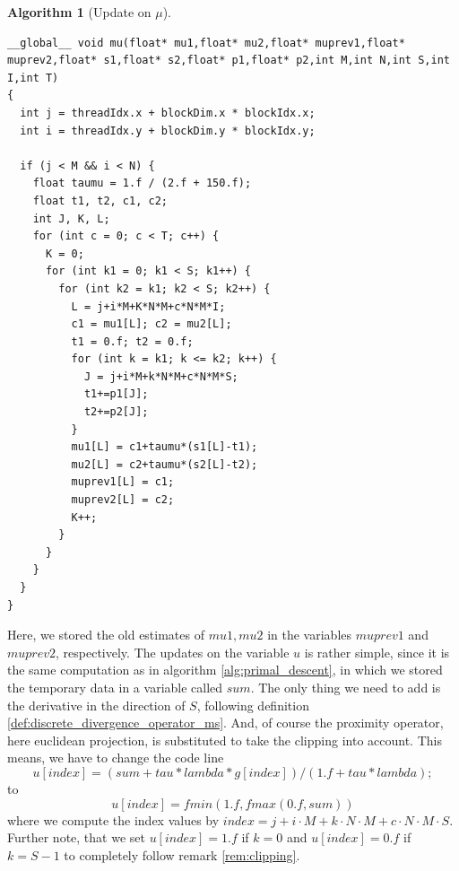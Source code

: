 \documentclass{scrreprt}
\newtheorem{algorithm}[theorem]{Algorithm}
\begin{document}
            \begin{algorithm}[Update on $\mu$]
                \label{alg:update_on_mu}
                \begin{lstlisting}
__global__ void mu(float* mu1,float* mu2,float* muprev1,float* muprev2,float* s1,float* s2,float* p1,float* p2,int M,int N,int S,int I,int T)
{
  int j = threadIdx.x + blockDim.x * blockIdx.x;
  int i = threadIdx.y + blockDim.y * blockIdx.y;

  if (j < M && i < N) {
    float taumu = 1.f / (2.f + 150.f);
    float t1, t2, c1, c2;
    int J, K, L;
    for (int c = 0; c < T; c++) {
      K = 0;
      for (int k1 = 0; k1 < S; k1++) {
        for (int k2 = k1; k2 < S; k2++) {
          L = j+i*M+K*N*M+c*N*M*I;
          c1 = mu1[L]; c2 = mu2[L];
          t1 = 0.f; t2 = 0.f;
          for (int k = k1; k <= k2; k++) {
            J = j+i*M+k*N*M+c*N*M*S;
            t1+=p1[J];
            t2+=p2[J];
          }
          mu1[L] = c1+taumu*(s1[L]-t1);
          mu2[L] = c2+taumu*(s2[L]-t2);
          muprev1[L] = c1;
          muprev2[L] = c2;
          K++;
        }
      }
    }
  }
}
                \end{lstlisting}
            \end{algorithm}

            Here, we stored the old estimates of $mu1, mu2$ in the variables $muprev1$ and $muprev2$, respectively. The updates on the variable $u$ is rather simple, since it is the same computation as in algorithm \ref{alg:primal_descent}, in which we stored the temporary data in a variable called $sum$. The only thing we need to add is the derivative in the direction of $S$, following definition \ref{def:discrete_divergence_operator_ms}. And, of course the proximity operator, here euclidean projection, is substituted to take the clipping into account. This means, we have to change the code line
                $$
                    u[index] = (sum + tau * lambda * g[index]) / (1.f + tau * lambda);
                $$
            to
                $$
                    u[index] = fmin(1.f, fmax(0.f, sum))
                $$
            where we compute the index values by $index = j + i \cdot M + k \cdot N \cdot M + c \cdot N \cdot M \cdot S$. Further note, that we set $u[index] = 1.f$ if $k = 0$ and $u[index] = 0.f$ if $k = S-1$ to completely follow remark \ref{rem:clipping}.
\end{document}
